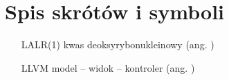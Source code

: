 \chapter{Spis skrótów i symboli}

\begin{itemize}
\item[LALR(1)] kwas deoksyrybonukleinowy (ang. ) 
\item[LLVM] model -- widok -- kontroler (ang. ) 
\end{itemize}
